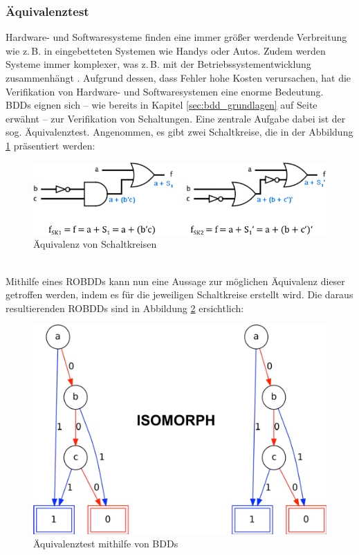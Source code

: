 \subsubsection{Äquivalenztest}
\label{sec:verifikation}
Hardware- und Softwaresysteme finden eine immer größer werdende Verbreitung wie z.\,B. in eingebetteten Systemen wie Handys oder Autos. Zudem werden Systeme immer komplexer, was z.\,B. mit der Betriebssystementwicklung zusammenhängt \cite{b2008}. Aufgrund dessen, dass Fehler hohe Kosten verursachen, hat die Verifikation von Hardware- und Softwaresystemen eine enorme Bedeutung.\\
BDDs eignen sich -- wie bereits in Kapitel \ref{sec:bdd_grundlagen} auf Seite \pageref{sec:bdd_grundlagen} erwähnt -- zur Verifikation von Schaltungen. Eine zentrale Aufgabe dabei ist der sog. Äquivalenztest. Angenommen, es gibt zwei Schaltkreise, die in der Abbildung \ref{fig:sks} präsentiert werden:
\begin{figure}[bth]
	\centering
	\includegraphics[scale=1.0]{./img/sks}
	\caption[Äquivalenz von Schaltkreisen]{Äquivalenz von Schaltkreisen}
	\label{fig:sks}
\end{figure}\\
\noindent
Mithilfe eines ROBDDs kann nun eine Aussage zur möglichen Äquivalenz dieser getroffen werden, indem es für die jeweiligen Schaltkreise erstellt wird. Die daraus resultierenden ROBDDs sind in Abbildung \ref{fig:aequivalenz} ersichtlich:
\begin{figure}[bth]
	\centering
	\includegraphics[scale=0.8]{./img/skbdds}
	\caption[Äquivalenztest mithilfe von BDDs]{Äquivalenztest mithilfe von BDDs}
	\label{fig:aequivalenz}
\end{figure}\\
